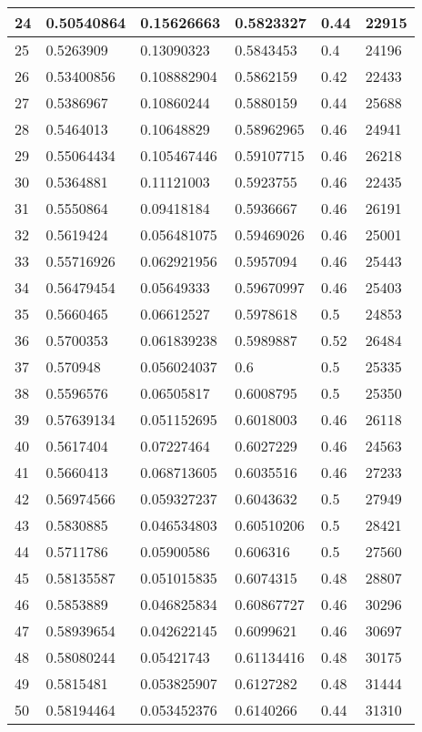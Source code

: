 \begin{longtable}{|l|l|l|l|l|l|}
24 & 0.50540864 & 0.15626663 & 0.5823327 & 0.44 & 22915 \\ \hline 
25 & 0.5263909 & 0.13090323 & 0.5843453 & 0.4 & 24196 \\ \hline 
26 & 0.53400856 & 0.108882904 & 0.5862159 & 0.42 & 22433 \\ \hline 
27 & 0.5386967 & 0.10860244 & 0.5880159 & 0.44 & 25688 \\ \hline 
28 & 0.5464013 & 0.10648829 & 0.58962965 & 0.46 & 24941 \\ \hline 
29 & 0.55064434 & 0.105467446 & 0.59107715 & 0.46 & 26218 \\ \hline 
30 & 0.5364881 & 0.11121003 & 0.5923755 & 0.46 & 22435 \\ \hline 
31 & 0.5550864 & 0.09418184 & 0.5936667 & 0.46 & 26191 \\ \hline 
32 & 0.5619424 & 0.056481075 & 0.59469026 & 0.46 & 25001 \\ \hline 
33 & 0.55716926 & 0.062921956 & 0.5957094 & 0.46 & 25443 \\ \hline 
34 & 0.56479454 & 0.05649333 & 0.59670997 & 0.46 & 25403 \\ \hline 
35 & 0.5660465 & 0.06612527 & 0.5978618 & 0.5 & 24853 \\ \hline 
36 & 0.5700353 & 0.061839238 & 0.5989887 & 0.52 & 26484 \\ \hline 
37 & 0.570948 & 0.056024037 & 0.6 & 0.5 & 25335 \\ \hline 
38 & 0.5596576 & 0.06505817 & 0.6008795 & 0.5 & 25350 \\ \hline 
39 & 0.57639134 & 0.051152695 & 0.6018003 & 0.46 & 26118 \\ \hline 
40 & 0.5617404 & 0.07227464 & 0.6027229 & 0.46 & 24563 \\ \hline 
41 & 0.5660413 & 0.068713605 & 0.6035516 & 0.46 & 27233 \\ \hline 
42 & 0.56974566 & 0.059327237 & 0.6043632 & 0.5 & 27949 \\ \hline 
43 & 0.5830885 & 0.046534803 & 0.60510206 & 0.5 & 28421 \\ \hline 
44 & 0.5711786 & 0.05900586 & 0.606316 & 0.5 & 27560 \\ \hline 
45 & 0.58135587 & 0.051015835 & 0.6074315 & 0.48 & 28807 \\ \hline 
46 & 0.5853889 & 0.046825834 & 0.60867727 & 0.46 & 30296 \\ \hline 
47 & 0.58939654 & 0.042622145 & 0.6099621 & 0.46 & 30697 \\ \hline 
48 & 0.58080244 & 0.05421743 & 0.61134416 & 0.48 & 30175 \\ \hline 
49 & 0.5815481 & 0.053825907 & 0.6127282 & 0.48 & 31444 \\ \hline 
50 & 0.58194464 & 0.053452376 & 0.6140266 & 0.44 & 31310 \\ \hline 
\end{longtable}
